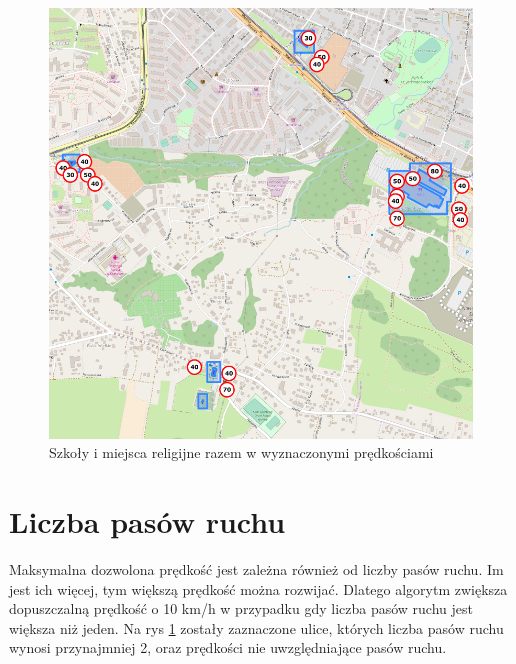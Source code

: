 \begin{figure}[h]
\caption{Szkoły i miejsca religijne razem w wyznaczonymi prędkościami}
\label{sec:shopsSpeed}
\centering
\includegraphics[width=1\textwidth]{shopsSpeed}
\end{figure}
\newpage
\section{Liczba pasów ruchu}
\label{sec:laneNumber}

Maksymalna dozwolona prędkość jest zależna również od liczby pasów ruchu. Im jest ich więcej, tym większą prędkość można rozwijać. Dlatego algorytm zwiększa dopuszczalną prędkość o 10 km/h w przypadku gdy liczba pasów ruchu jest większa niż jeden. Na rys \ref{sec:laneNumber} zostały zaznaczone ulice, których liczba pasów ruchu wynosi przynajmniej 2, oraz prędkości nie uwzględniające pasów ruchu. 

